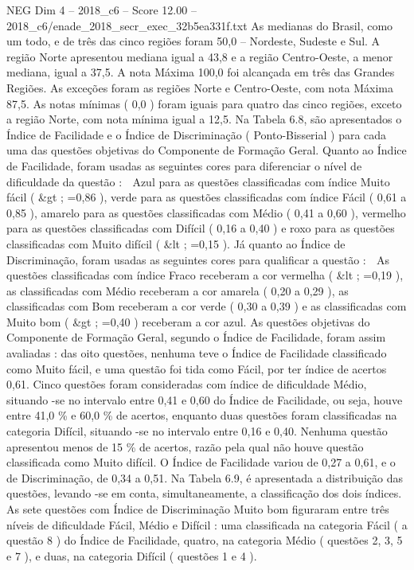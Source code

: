 \begin{textsample}{NEG Dim 4 – 2018\_c6 – Score 12.00 – 2018\_c6/enade\_2018\_secr\_exec\_32b5ea331f.txt}
As medianas do Brasil, como um todo, e de três das cinco regiões foram 50,0 – Nordeste, Sudeste e Sul.
A região Norte apresentou mediana igual a 43,8 e a região Centro-Oeste, a menor mediana, igual a 37,5.
A nota Máxima 100,0 foi alcançada em três das Grandes Regiões.
As exceções foram as regiões Norte e Centro-Oeste, com nota Máxima 87,5.
As notas mínimas ( 0,0 ) foram iguais para quatro das cinco regiões, exceto a região Norte, com nota mínima igual a 12,5.
Na Tabela 6.8, são apresentados o Índice de Facilidade e o Índice de Discriminação ( Ponto-Bisserial ) para cada uma das questões objetivas do Componente de Formação Geral.
Quanto ao Índice de Facilidade, foram usadas as seguintes cores para diferenciar o nível de dificuldade da questão :  Azul para as questões classificadas com índice Muito fácil ( \&gt ; =0,86 ), verde para as questões classificadas com índice Fácil ( 0,61 a 0,85 ), amarelo para as questões classificadas com Médio ( 0,41 a 0,60 ), vermelho para as questões classificadas com Difícil ( 0,16 a 0,40 ) e roxo para as questões classificadas com Muito difícil ( \&lt ; =0,15 ).
Já quanto ao Índice de Discriminação, foram usadas as seguintes cores para qualificar a questão :  As questões classificadas com índice Fraco receberam a cor vermelha ( \&lt ; =0,19 ), as classificadas com Médio receberam a cor amarela ( 0,20 a 0,29 ), as classificadas com Bom receberam a cor verde ( 0,30 a 0,39 ) e as classificadas com Muito bom ( \&gt ; =0,40 ) receberam a cor azul.
As questões objetivas do Componente de Formação Geral, segundo o Índice de Facilidade, foram assim avaliadas : das oito questões, nenhuma teve o Índice de Facilidade classificado como Muito fácil, e uma questão foi tida como Fácil, por ter índice de acertos 0,61.
Cinco questões foram consideradas com índice de dificuldade Médio, situando -se no intervalo entre 0,41 e 0,60 do Índice de Facilidade, ou seja, houve entre 41,0 \% e 60,0 \% de acertos, enquanto duas questões foram classificadas na categoria Difícil, situando -se no intervalo entre 0,16 e 0,40.
Nenhuma questão apresentou menos de 15 \% de acertos, razão pela qual não houve questão classificada como Muito difícil.
O Índice de Facilidade variou de 0,27 a 0,61, e o de Discriminação, de 0,34 a 0,51.
Na Tabela 6.9, é apresentada a distribuição das questões, levando -se em conta, simultaneamente, a classificação dos dois índices.
As sete questões com Índice de Discriminação Muito bom figuraram entre três níveis de dificuldade Fácil, Médio e Difícil : uma classificada na categoria Fácil ( a questão 8 ) do Índice de Facilidade, quatro, na categoria Médio ( questões 2, 3, 5 e 7 ), e duas, na categoria Difícil ( questões 1 e 4 ).

\end{textsample}
